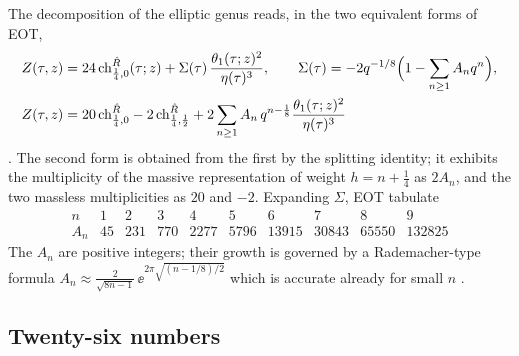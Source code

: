 The decomposition of the elliptic genus reads, in the two equivalent forms of EOT,
\begin{align}
  Z(\tau,z)&=24\,\mathrm{ch}^{\hat R}_{\frac14,0}(\tau;z)+\Sigma(\tau)\,
    \frac{\theta_1(\tau;z)^2}{\eta(\tau)^3},\qquad
    \Sigma(\tau)=-2q^{-1/8}\Bigl(1-\sum_{n\ge1}A_nq^n\Bigr),
    \label{eq:moonshine:decompSigma}\\
  Z(\tau,z)&=20\,\mathrm{ch}^{\hat R}_{\frac14,0}-2\,\mathrm{ch}^{\hat R}_{\frac14,\frac12}
    +2\sum_{n\ge1}A_n\,q^{n-\frac18}\frac{\theta_1(\tau;z)^2}{\eta(\tau)^3}
    \label{eq:moonshine:decomp}
\end{align}
. The second form is obtained from the first by the splitting
identity; it exhibits the multiplicity of the massive representation of weight
$h=n+\tfrac14$ as $2A_n$, and the two massless multiplicities as $20$ and $-2$. Expanding
$\Sigma$, EOT tabulate 
\begin{equation}\label{eq:moonshine:An}
\begin{array}{c|ccccccccc}
 n & 1&2&3&4&5&6&7&8&9\\ \hline
 A_n & 45&231&770&2277&5796&13915&30843&65550&132825
\end{array}
\end{equation}
The $A_n$ are positive integers; their growth is governed by a Rademacher-type formula
$A_n\approx\frac{2}{\sqrt{8n-1}}\,\ee^{2\pi\sqrt{(n-1/8)/2}}$ which is accurate already for
small $n$ .

\subsection{Twenty-six numbers}


